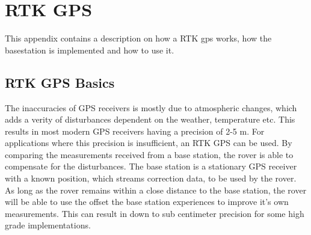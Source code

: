 \chapter{RTK GPS}\label{app:rtk_gps}
This appendix contains a description on how a RTK gps works, how the basestation is implemented and how to use it.


\section*{RTK GPS Basics}
The inaccuracies of GPS receivers is mostly due to atmospheric changes, which adds a verity of disturbances dependent on the weather, temperature etc.
This results in most modern GPS receivers having a precision of 2-5 m. 
For applications where this precision is insufficient, an RTK GPS can be used. 
By comparing the measurements received from a base station, the rover is able to compensate for the disturbances.
The base station is a stationary GPS receiver with a known position, which streams correction data, to be used by the rover. 
As long as the rover remains within a close distance to the base station, the rover will be able to use the offset the base station experiences to improve it's own measurements.
This can result in down to sub centimeter precision for some high grade implementations.

